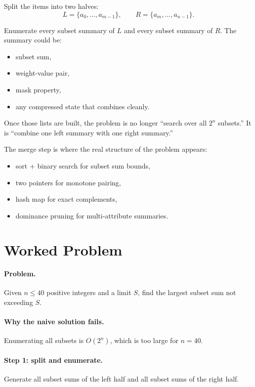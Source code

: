 Split the items into two halves:
\[
L = \{a_0,\dots,a_{m-1}\},\qquad
R = \{a_m,\dots,a_{n-1}\}.
\]

Enumerate every subset summary of \(L\) and every subset summary of \(R\). The summary could be:

\begin{itemize}
  \item subset sum,
  \item weight-value pair,
  \item mask property,
  \item any compressed state that combines cleanly.
\end{itemize}

Once those lists are built, the problem is no longer ``search over all \(2^n\) subsets.'' It is ``combine one left
summary with one right summary.''

The merge step is where the real structure of the problem appears:

\begin{itemize}
  \item sort + binary search for subset sum bounds,
  \item two pointers for monotone pairing,
  \item hash map for exact complements,
  \item dominance pruning for multi-attribute summaries.
\end{itemize}

\section*{Worked Problem}

\paragraph{Problem.}
Given \(n \le 40\) positive integers and a limit \(S\), find the largest subset sum not exceeding \(S\).

\paragraph{Why the naive solution fails.}
Enumerating all subsets is \(O(2^n)\), which is too large for \(n=40\).

\paragraph{Step 1: split and enumerate.}
Generate all subset sums of the left half and all subset sums of the right half.

